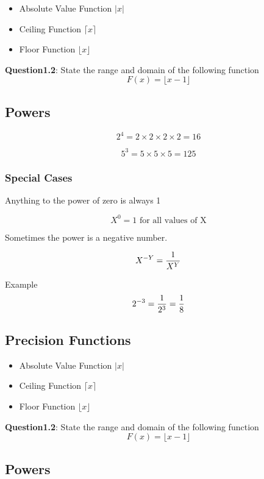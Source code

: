\documentclass[]{report}
\begin{document}
\begin{itemize}
\item Absolute Value Function $| x |$
\item Ceiling Function $\lceil x \rceil$
\item Floor Function  $\lfloor x \rfloor $
\end{itemize}

\noindent \textbf{Question1.2}: State the range and domain of the following function
\[ F(x) = \lfloor x-1 \rfloor \]
\subsection{Powers}

\[  2^ 4 = 2 \times 2 \times 2 \times 2 = 16 \]

\[  5^ 3 = 5 \times 5 \times 5 =125 \]

\subsubsection{Special Cases}

Anything to the power of zero is always 1

\[  X^ 0 = 1 \mbox{ for all values of X} \]

Sometimes the power is a negative number.

\[  X^{-Y} = { 1 \over X^Y}  \]

Example 
\[  2^{-3} = { 1 \over 2^3} = { 1 \over 8}  \]

\subsection{Precision Functions}

\begin{itemize}
\item Absolute Value Function $| x |$
\item Ceiling Function $\lceil x \rceil$
\item Floor Function  $\lfloor x \rfloor $
\end{itemize}

\noindent \textbf{Question1.2}: State the range and domain of the following function
\[ F(x) = \lfloor x-1 \rfloor \]
\subsection{Powers}
\end{document}
